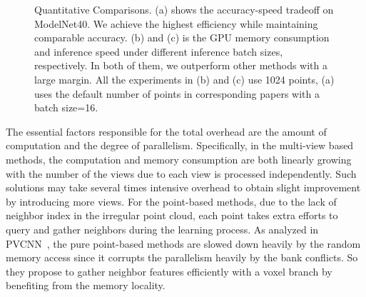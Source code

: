 \documentclass[journal]{IEEEtran}
\begin{document}
\begin{figure*}[t]
\begin{center}

\end{center}
\vspace{-0.2cm}
   \caption{Quantitative Comparisons. (a) shows the accuracy-speed tradeoff on ModelNet40. We achieve the highest efficiency while maintaining comparable accuracy. (b) and (c) is the GPU memory consumption and inference speed under different inference batch sizes, respectively. In both of them, we outperform other methods with a large margin. All the experiments in (b) and (c) use 1024 points, (a) uses the default number of points in corresponding papers with a batch size=16.}
   \label{fig:overhead}
\end{figure*}


The essential factors responsible for the total overhead are the amount of computation and the degree of parallelism. Specifically, in the multi-view based methods, the computation and memory consumption are both linearly growing with the number of the views due to each view is processed independently. Such solutions may take several times intensive overhead to obtain slight improvement by introducing more views. For the point-based methods, due to the lack of neighbor index in the irregular point cloud, each point takes extra efforts to query and gather neighbors during the learning process. As analyzed in PVCNN~\cite{pvcnn}, the pure point-based methods are slowed down heavily by the random memory access since it corrupts the parallelism heavily by the bank conflicts. So they propose to gather neighbor features efficiently with a voxel branch by benefiting from the memory locality.
\end{document}
